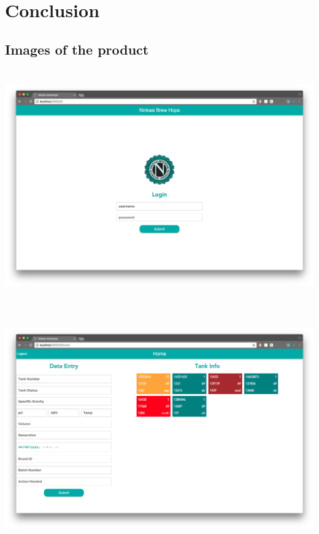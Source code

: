 \documentclass[draftclsnofoot,onecolumn,letterpaper,10pt,compsoc]{IEEEtran}
\begin{document}
\section{Conclusion}

\subsection{Images of the product}
\centerline{\includegraphics[height=10cm]{screenshots/desktop/login.png}}
\centerline{\includegraphics[height=10cm]{screenshots/desktop/home.png}}
\end{document}
